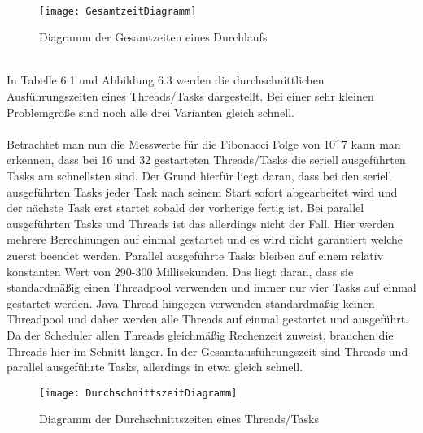 \\
\begin{figure}
\centering
\texttt{[image: GesamtzeitDiagramm]}
\caption{Diagramm der Gesamtzeiten eines Durchlaufs}
\label{fig:GesamtzeitDiagramm}
\end{figure}
\\
In Tabelle 6.1 und Abbildung 6.3 werden die durchschnittlichen Ausführungszeiten eines Threads/Tasks dargestellt. Bei einer sehr kleinen Problemgröße sind noch alle drei Varianten gleich schnell.
\\
\\
Betrachtet man nun die Messwerte für die Fibonacci Folge von 10\textasciicircum 7 kann man erkennen, dass bei 16 und 32 gestarteten Threads/Tasks die seriell ausgeführten Tasks am schnellsten sind. Der Grund hierfür liegt daran, dass bei den seriell ausgeführten Tasks jeder Task nach seinem Start sofort abgearbeitet wird und der nächste Task erst startet sobald der vorherige fertig ist. Bei parallel ausgeführten Tasks und Threads ist das allerdings nicht der Fall. Hier werden mehrere Berechnungen auf einmal gestartet und es wird nicht garantiert welche zuerst beendet werden. Parallel ausgeführte Tasks bleiben auf einem relativ konstanten Wert von 290-300 Millisekunden. Das liegt daran, dass sie standardmäßig einen Threadpool verwenden und immer nur vier Tasks auf einmal gestartet werden. Java Thread hingegen verwenden standardmäßig keinen Threadpool und daher werden alle Threads auf einmal gestartet und ausgeführt. Da der Scheduler allen Threads gleichmäßig Rechenzeit zuweist, brauchen die Threads hier im Schnitt länger. In der Gesamtausführungszeit sind Threads und parallel ausgeführte Tasks, allerdings in etwa gleich schnell.

\begin{figure}
\centering
\texttt{[image: DurchschnittszeitDiagramm]}
\caption{Diagramm der Durchschnittszeiten eines Threads/Tasks}
\label{fig:DurchschnittszeitDiagramm}
\end{figure}